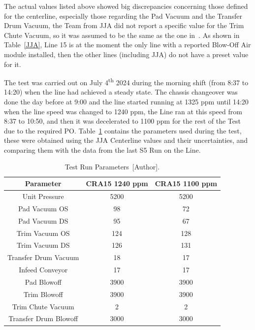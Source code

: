 The actual values listed above showed big discrepancies concerning those defined for the centerline, especially those regarding the Pad Vacuum and the Transfer Drum Vacuum, the Team from JJA did not report a specific value for the Trim Chute Vacuum, so it was assumed to be the same as the one in~\cite{S5Center}. As shown in Table~\ref{JJA}, Line 15 is at the moment the only line with a reported Blow-Off Air module installed, then the other lines (including JJA) do not have a preset value for it.

The test was carried out on July 4\textsuperscript{th} 2024 during the morning shift (from 8:37 to 14:20) when the line had achieved a steady state. The chassis changeover was done the day before at 9:00 and the line started running at 1325 ppm until 14:20 when the line speed was changed to 1240 ppm, the Line ran at this speed from 8:37 to 10:50, and then it was decelerated to 1100 ppm for the rest of the Test due to the required PO. Table~\ref{TL15} contains the parameters used during the test, these were obtained using the JJA Centerline values and their uncertainties, and comparing them with the data from the last S5 Run on the Line. 

\begin{table}[H]
\centering
\scriptsize
\begin{tabular}{ccc}
\hline
\textbf{Parameter} & \textbf{CRA15 1240 ppm} &  \textbf{CRA15 1100 ppm} \\
\hline
Unit Pressure                 & 5200      & 5200 \\
Pad Vacuum OS                 & 98        & 72    \\
Pad Vacuum DS                 & 95        & 67     \\ 
Trim Vacuum OS                & 124       & 128     \\
Trim Vacuum DS                & 126       & 131      \\ 
Transfer Drum Vacuum          & 18        & 17        \\
Infeed Conveyor               & 17        & 17         \\
Pad Blowoff                   & 3900      & 3900        \\
Trim Blowoff                  & 3900      & 3900         \\
Trim Chute Vacuum             & 2         & 2             \\
Transfer Drum Blowoff         & 3000      & 3000         \\  \hline
\end{tabular}
\caption{Test Run Parameters~[Author].}
\label{TL15}
\end{table}

